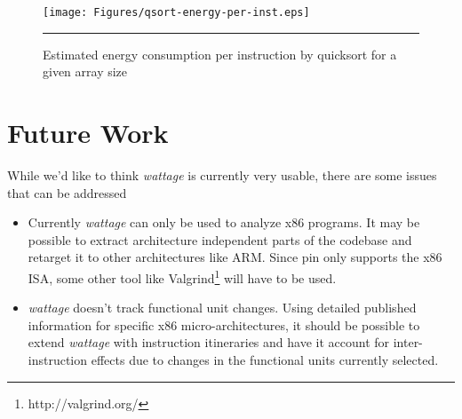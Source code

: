\begin{figure}[htbp]
  \centering
  \texttt{[image: Figures/qsort-energy-per-inst.eps]}
  \rule{35em}{0.5pt}
  \caption{Estimated energy consumption per instruction by quicksort
    for a given array size}
  \label{fig:qsort-energy-per-inst-per-array-length}
\end{figure}

\section{Future Work}

While we'd like to think \textit{wattage} is currently very usable,
there are some issues that can be addressed

\begin{itemize}
  \item Currently \textit{wattage} can only be used to analyze x86
    programs.  It may be possible to extract architecture independent
    parts of the codebase and retarget it to other architectures like
    ARM.  Since pin only supports the x86 ISA, some other tool like
    Valgrind\footnote{http://valgrind.org/} will have to be used.

  \item \textit{wattage} doesn't track functional unit changes.  Using
    detailed published information for specific x86
    micro-architectures, it should be possible to extend
    \textit{wattage} with instruction itineraries and have it account
    for inter-instruction effects due to changes in the functional
    units currently selected.
\end{itemize}
